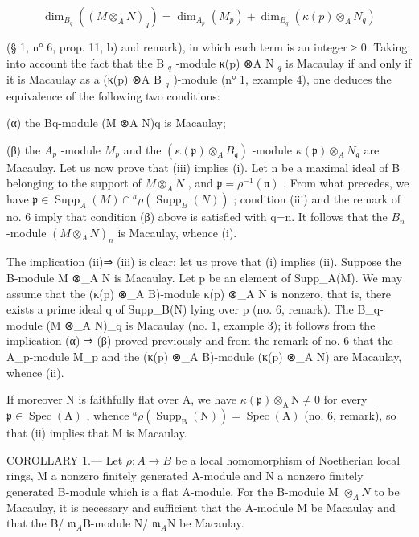 \[
\dim_ {B _ {q}} \left(\left(M \otimes_ {A} N\right) _ {q}\right) = \dim_ {A _ {p}} \left(M _ {p}\right) + \dim_ {B _ {q}} \left(\kappa (p) \otimes_ {A} N _ {q}\right)
\]

(§ 1, n° 6, prop. 11, b) and remark), in which each term is an integer ≥ 0. Taking into account the fact that the B \(_{q}\) -module κ(p) ⊗A N \(_{q}\) is Macaulay if and only if it is Macaulay as a (κ(p) ⊗A B \(_{q}\) )-module (n° 1, example 4), one deduces the equivalence of the following two conditions:

(α) the Bq-module (M ⊗A N)q is Macaulay;

(β) the \(A_{p}\) -module \(M_{p}\) and the \((\kappa(\mathfrak{p})\otimes_{A}B_{\mathfrak{q}})\) -module \(\kappa(\mathfrak{p})\otimes_{A}N_{\mathfrak{q}}\) are Macaulay. Let us now prove that (iii) implies (i). Let n be a maximal ideal of B belonging to the support of \(M\otimes_{A}N\) , and \(\mathfrak{p}=\rho^{-1}(\mathfrak{n})\) . From what precedes, we have \(\mathfrak{p}\in\operatorname{Supp}_{A}(M)\cap{}^{a}\rho(\operatorname{Supp}_{B}(N))\) ; condition (iii) and the remark of no. 6 imply that condition (β) above is satisfied with q=n. It follows that the \(B_{n}\) -module \((M\otimes_{A}N)_{n}\) is Macaulay, whence (i).

The implication (ii)⇒ (iii) is clear; let us prove that (i) implies (ii). Suppose the B-module M ⊗\_A N is Macaulay. Let p be an element of Supp\_A(M). We may assume that the (κ(p) ⊗\_A B)-module κ(p) ⊗\_A N is nonzero, that is, there exists a prime ideal q of Supp\_B(N) lying over p (no. 6, remark). The B\_q-module (M ⊗\_A N)\_q is Macaulay (no. 1, example 3); it follows from the implication (α) ⇒ (β) proved previously and from the remark of no. 6 that the A\_p-module M\_p and the (κ(p) ⊗\_A B)-module (κ(p) ⊗\_A N) are Macaulay, whence (ii).

If moreover N is faithfully flat over A, we have \(\kappa(\mathfrak{p})\otimes_{\mathrm{A}}\mathrm{N}\neq 0\) for every \(\mathfrak{p}\in\operatorname{Spec}(\mathrm{A})\) , whence \({}^{a}\rho(\operatorname{Supp}_{\mathrm{B}}(\mathrm{N}))=\operatorname{Spec}(\mathrm{A})\) (no. 6, remark), so that (ii) implies that M is Macaulay.

COROLLARY 1.--- Let \(\rho: A \to B\) be a local homomorphism of Noetherian local rings, M a nonzero finitely generated A-module and N a nonzero finitely generated B-module which is a flat A-module. For the B-module M \(\otimes_{A}N\) to be Macaulay, it is necessary and sufficient that the A-module M be Macaulay and that the B/ \(\mathfrak{m}_{A}\)B-module N/ \(\mathfrak{m}_{A}\)N be Macaulay.

